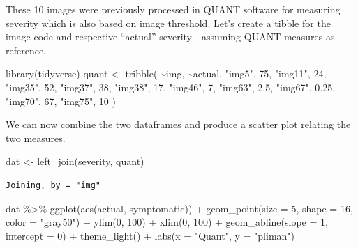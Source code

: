 \documentclass[
  letterpaper,
  DIV=11,
  numbers=noendperiod]{scrreprt}
\newenvironment{Shaded}{\begin{snugshade}}{\end{snugshade}}
\newcommand{\AttributeTok}[1]{\textcolor[rgb]{0.40,0.45,0.13}{#1}}
\newcommand{\DecValTok}[1]{\textcolor[rgb]{0.68,0.00,0.00}{#1}}
\newcommand{\FloatTok}[1]{\textcolor[rgb]{0.68,0.00,0.00}{#1}}
\newcommand{\FunctionTok}[1]{\textcolor[rgb]{0.28,0.35,0.67}{#1}}
\newcommand{\NormalTok}[1]{\textcolor[rgb]{0.00,0.23,0.31}{#1}}
\newcommand{\OtherTok}[1]{\textcolor[rgb]{0.00,0.23,0.31}{#1}}
\newcommand{\SpecialCharTok}[1]{\textcolor[rgb]{0.37,0.37,0.37}{#1}}
\newcommand{\StringTok}[1]{\textcolor[rgb]{0.13,0.47,0.30}{#1}}
\begin{document}
These 10 images were previously processed in QUANT software for
measuring severity which is also based on image threshold. Let's create
a tibble for the image code and respective ``actual'' severity -
assuming QUANT measures as reference.

\begin{Shaded}
\begin{Highlighting}[]
\FunctionTok{library}\NormalTok{(tidyverse)}
\NormalTok{quant }\OtherTok{\textless{}{-}} \FunctionTok{tribble}\NormalTok{(}
  \SpecialCharTok{\textasciitilde{}}\NormalTok{img, }\SpecialCharTok{\textasciitilde{}}\NormalTok{actual,}
   \StringTok{"img5"}\NormalTok{,     }\DecValTok{75}\NormalTok{,}
  \StringTok{"img11"}\NormalTok{,     }\DecValTok{24}\NormalTok{,}
  \StringTok{"img35"}\NormalTok{,     }\DecValTok{52}\NormalTok{,}
  \StringTok{"img37"}\NormalTok{,     }\DecValTok{38}\NormalTok{,}
  \StringTok{"img38"}\NormalTok{,     }\DecValTok{17}\NormalTok{,}
  \StringTok{"img46"}\NormalTok{,      }\DecValTok{7}\NormalTok{,}
  \StringTok{"img63"}\NormalTok{,    }\FloatTok{2.5}\NormalTok{,}
  \StringTok{"img67"}\NormalTok{,   }\FloatTok{0.25}\NormalTok{,}
  \StringTok{"img70"}\NormalTok{,     }\DecValTok{67}\NormalTok{,}
  \StringTok{"img75"}\NormalTok{,     }\DecValTok{10}
\NormalTok{  )}
\end{Highlighting}
\end{Shaded}

We can now combine the two dataframes and produce a scatter plot
relating the two measures.

\begin{Shaded}
\begin{Highlighting}[]
\NormalTok{dat }\OtherTok{\textless{}{-}} \FunctionTok{left\_join}\NormalTok{(severity, quant)}
\end{Highlighting}
\end{Shaded}

\begin{verbatim}
Joining, by = "img"
\end{verbatim}

\begin{Shaded}
\begin{Highlighting}[]
\NormalTok{dat }\SpecialCharTok{\%\textgreater{}\%}
  \FunctionTok{ggplot}\NormalTok{(}\FunctionTok{aes}\NormalTok{(actual, symptomatic)) }\SpecialCharTok{+}
  \FunctionTok{geom\_point}\NormalTok{(}\AttributeTok{size =} \DecValTok{5}\NormalTok{, }\AttributeTok{shape =} \DecValTok{16}\NormalTok{, }\AttributeTok{color =} \StringTok{"gray50"}\NormalTok{) }\SpecialCharTok{+}
  \FunctionTok{ylim}\NormalTok{(}\DecValTok{0}\NormalTok{, }\DecValTok{100}\NormalTok{) }\SpecialCharTok{+}
  \FunctionTok{xlim}\NormalTok{(}\DecValTok{0}\NormalTok{, }\DecValTok{100}\NormalTok{) }\SpecialCharTok{+}
  \FunctionTok{geom\_abline}\NormalTok{(}\AttributeTok{slope =} \DecValTok{1}\NormalTok{, }\AttributeTok{intercept =} \DecValTok{0}\NormalTok{) }\SpecialCharTok{+}
  \FunctionTok{theme\_light}\NormalTok{() }\SpecialCharTok{+}
  \FunctionTok{labs}\NormalTok{(}\AttributeTok{x =} \StringTok{"Quant"}\NormalTok{,}
       \AttributeTok{y =} \StringTok{"pliman"}\NormalTok{)}
\end{Highlighting}
\end{Shaded}
\end{document}
